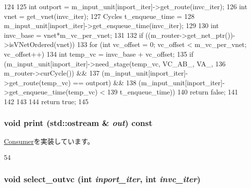 \begin{DoxyCode}
124 {
125     int outport = m_input_unit[inport_iter]->get_route(invc_iter);
126     int vnet = get_vnet(invc_iter);
127     Cycles t_enqueue_time =
128         m_input_unit[inport_iter]->get_enqueue_time(invc_iter);
129 
130     int invc_base = vnet*m_vc_per_vnet;
131 
132     if ((m_router->get_net_ptr())->isVNetOrdered(vnet)) {
133         for (int vc_offset = 0; vc_offset < m_vc_per_vnet; vc_offset++) {
134             int temp_vc = invc_base + vc_offset;
135             if (m_input_unit[inport_iter]->need_stage(temp_vc, VC_AB_, VA_,
136                                                       m_router->curCycle()) &&
137                (m_input_unit[inport_iter]->get_route(temp_vc) == outport) &&
138                (m_input_unit[inport_iter]->get_enqueue_time(temp_vc) <
139                     t_enqueue_time)) {
140                 return false;
141             }
142         }
143     }
144     return true;
145 }
\end{DoxyCode}
\hypertarget{classVCallocator__d_ac55fe386a101fbae38c716067c9966a0}{
\subsubsection[{print}]{\setlength{\rightskip}{0pt plus 5cm}void print (std::ostream \& {\em out}) const}}
\label{classVCallocator__d_ac55fe386a101fbae38c716067c9966a0}


\hyperlink{classConsumer_a3ea5f7af5db62cc24f4e40df9ea5c971}{Consumer}を実装しています。


\begin{DoxyCode}
54 {}
\end{DoxyCode}
\hypertarget{classVCallocator__d_ab7aae435497572df5d64fe006f34ca7a}{
\subsubsection[{select\_\-outvc}]{\setlength{\rightskip}{0pt plus 5cm}void select\_\-outvc (int {\em inport\_\-iter}, \/  int {\em invc\_\-iter})}}
\label{classVCallocator__d_ab7aae435497572df5d64fe006f34ca7a}



